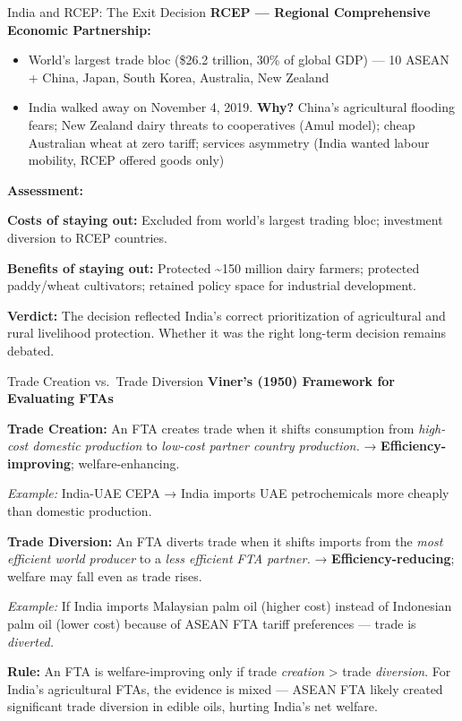 \documentclass[
  ignorenonframetext,
  aspectratio=169,
]{beamer}
\makeatletter
\providecommand{\tightlist}{%
  \setlength{\itemsep}{0pt}\setlength{\parskip}{0pt}}
\let\quarto@originallabel\label
\DeclareRobustCommand*{\label}[1]{\quarto@originallabel{#1}}
\makeatother
\begin{document}
\begin{frame}{India and RCEP: The Exit Decision}
\label{india-and-rcep-the-exit-decision}
\textbf{RCEP --- Regional Comprehensive Economic Partnership:}

\begin{itemize}
\tightlist
\item
  World's largest trade bloc (\$26.2 trillion, 30\% of global GDP) ---
  10 ASEAN + China, Japan, South Korea, Australia, New Zealand
\item
  India walked away on November 4, 2019. \textbf{Why?} China's
  agricultural flooding fears; New Zealand dairy threats to cooperatives
  (Amul model); cheap Australian wheat at zero tariff; services
  asymmetry (India wanted labour mobility, RCEP offered goods only)
\end{itemize}

\textbf{Assessment:}

\textbf{Costs of staying out:} Excluded from world's largest trading
bloc; investment diversion to RCEP countries.

\textbf{Benefits of staying out:} Protected \textasciitilde150 million
dairy farmers; protected paddy/wheat cultivators; retained policy space
for industrial development.

\textbf{Verdict:} The decision reflected India's correct prioritization
of agricultural and rural livelihood protection. Whether it was the
right long-term decision remains debated.
\end{frame}

\begin{frame}{Trade Creation vs.~Trade Diversion}
\label{trade-creation-vs.-trade-diversion}
\textbf{Viner's (1950) Framework for Evaluating FTAs}

\textbf{Trade Creation:} An FTA creates trade when it shifts consumption
from \emph{high-cost domestic production} to \emph{low-cost partner
country production.} → \textbf{Efficiency-improving}; welfare-enhancing.

\emph{Example:} India-UAE CEPA → India imports UAE petrochemicals more
cheaply than domestic production.

\textbf{Trade Diversion:} An FTA diverts trade when it shifts imports
from the \emph{most efficient world producer} to a \emph{less efficient
FTA partner.} → \textbf{Efficiency-reducing}; welfare may fall even as
trade rises.

\emph{Example:} If India imports Malaysian palm oil (higher cost)
instead of Indonesian palm oil (lower cost) because of ASEAN FTA tariff
preferences --- trade is \emph{diverted.}

\textbf{Rule:} An FTA is welfare-improving only if trade \emph{creation}
\textgreater{} trade \emph{diversion}. For India's agricultural FTAs,
the evidence is mixed --- ASEAN FTA likely created significant trade
diversion in edible oils, hurting India's net welfare.
\end{frame}
\end{document}
